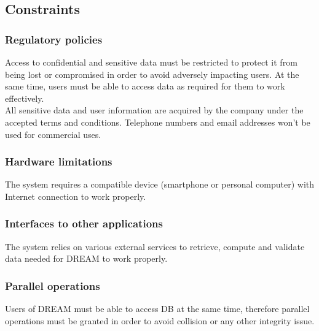 \subsection{Constraints}

\subsubsection{Regulatory policies}
Access to confidential and sensitive data must be restricted to protect it from being lost or compromised in order to avoid adversely impacting users. At the same time, users must be able to access data as required for them to work effectively.\\ All sensitive data and user information are acquired by the company under the accepted terms and conditions. Telephone numbers and email addresses won't be used for commercial uses.

\subsubsection{Hardware limitations}
The system requires a compatible device (smartphone or personal computer) with Internet connection to work properly. 

\subsubsection{Interfaces to other applications}
The system relies on various external services to retrieve, compute and validate data needed for DREAM to work properly.

\subsubsection{Parallel operations}
Users of DREAM must be able to access DB at the same time, therefore parallel operations must be granted in order to avoid collision or any other integrity issue.

